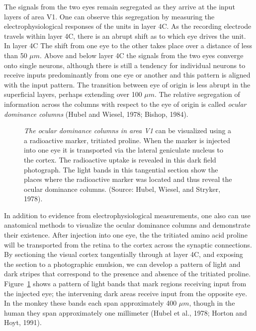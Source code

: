 The signals from the two eyes remain segregated
as they arrive at the input layers of area V1.
One can observe this segregation by measuring
the electrophysiological responses
of the units in layer 4C.
As the recording electrode travels within layer 4C, 
there is an abrupt shift as to which eye drives the unit.
In layer 4C The shift from one eye to the other takes place 
over a distance of less than 50 $\mu m$.
Above and below layer 4C the signals from the two eyes
converge onto single neurons, although there is still
a tendency for individual neurons to receive inputs
predominantly from one eye or another and this pattern
is aligned with the input pattern.
The transition between eye
of origin is less abrupt in the superficial layers,
perhaps extending over 100 $\mu m$.
The relative segregation of information across
the columns with respect to
the eye of origin is called {\em ocular dominance columns}
(Hubel and Wiesel, 1978; Bishop, 1984).	%

\begin{figure}
\centerline {
}
\caption[Ocular Dominance Columns]{
{\em The ocular dominance columns in area V1}
can be visualized using a
a radioactive marker, tritiated proline.
When the marker is injected into one eye it is
transported via the lateral geniculate
nucleus to the cortex.
The radioactive uptake is revealed
in this dark field photograph.
The light bands in this
tangential section show the places where
the radioactive marker was located and 
thus reveal the ocular dominance columns.
(Source: Hubel, Wiesel, and Stryker, 1978).
}
\label{f5:ocularDominance}
\end{figure}
In addition to evidence from electrophysiological measurements,
one also can use anatomical methods to
visualize the ocular dominance columns and demonstrate
their existence.
After injection
into one eye, the  the tritiated amino acid proline
will be transported from the retina to the cortex
across the synaptic connections.
By sectioning the visual cortex tangentially through at layer 4C,
and exposing the section to a photographic emulsion,
we can develop a pattern of light and dark stripes
that correspond to the presence and absence of the tritiated proline.
Figure~\ref{f5:ocularDominance} shows
a pattern of light bands that mark regions
receiving input from the injected eye;
the intervening dark
areas receive input from the opposite eye.
In the monkey these bands each span approximately 400 $\mu m$,
though in the human they span approximately one millimeter
(Hubel et al., 1978;  Horton and Hoyt, 1991).

